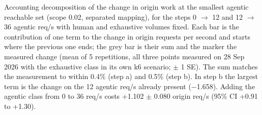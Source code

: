 Accounting decomposition of the change in origin work at the smallest agentic reachable set (scope 0.02, separated mapping), for the steps 0 $\rightarrow$ 12 and 12 $\rightarrow$ 36 agentic req/s with human and exhaustive volumes fixed. Each bar is the contribution of one term to the change in origin requests per second and starts where the previous one ends; the grey bar is their sum and the marker the measured change (mean of 5 repetitions, all three points measured on 28 Sep 2026 with the exhaustive class in its own k6 scenario; $\pm$ 1 SE). The sum matches the measurement to within 0.4\% (step a) and 0.5\% (step b). In step b the largest term is the change on the 12 agentic req/s already present ($-$1.658). Adding the agentic class from 0 to 36 req/s costs +1.102 $\pm$ 0.080 origin req/s (95\% CI +0.91 to +1.30).
